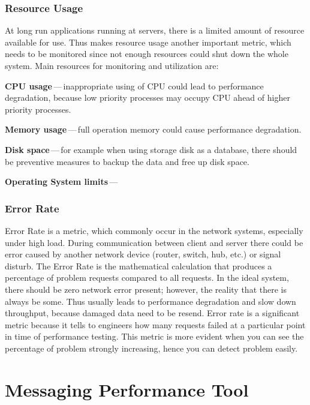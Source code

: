 \subsection{Resource Usage}
At long run applications running at servers, there is a limited amount of resource available for use. Thus makes resource usage another important metric, which needs to be monitored since not enough resources could shut down the whole system. Main resources for monitoring and utilization are:

\begin{description}
	\setlength\itemsep{0em}
	\item \textbf{CPU usage}\,---\,inappropriate using of CPU could lead to performance degradation, because low priority processes may occupy CPU ahead of higher priority processes.
	\item \textbf{Memory usage}\,---\,full operation memory could cause performance degradation.
	\item \textbf{Disk space}\,---\,for example when using storage disk as a database, there should be preventive measures to backup the data and free up disk space.
	\item \textbf{Operating System limits}\,---\,
\end{description}


\subsection{Error Rate}
Error Rate is a metric, which commonly occur in the network systems, especially under high load. During communication between client and server there could be error caused by another network device (router, switch, hub, etc.) or signal disturb. The Error Rate is the mathematical calculation that produces a percentage of problem requests compared to all requests. In the ideal system, there should be zero network error present; however, the reality that there is always be some. Thus usually leads to performance degradation and slow down throughput, because damaged data need to be resend.
Error rate is a significant metric because it tells to engineers how many requests failed at a particular point in time of performance testing. This metric is more evident when you can see the percentage of problem strongly increasing, hence you can detect problem easily.

\chapter{Messaging Performance Tool}
\label{Messaging Performance Tool}


